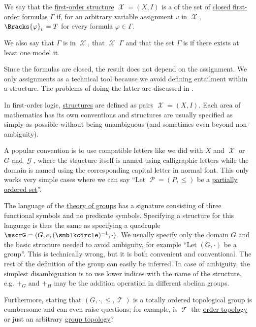\begin{definition}\label{def:first_order_model}
  We say that the \hyperref[def:first_order_structure]{first-order structure} \( \mscrX = (X, I) \) is a  of the set of \hyperref[def:first_order_syntax/closed_formula]{closed first-order formulas} \( \Gamma \) if, for an arbitrary variable assignment \( v \) in \( \mscrX \), \( \Bracks{\varphi}_v = T \) for every formula \( \varphi \in \Gamma \).

  We also say that \( \Gamma \) is  in \( \mscrX \), that \( \mscrX \)  \( \Gamma \) and that the set \( \Gamma \) is  if there exists at least one model it.
\end{definition}
\begin{comments}
  \item Since the formulas are closed, the result does not depend on the assignment. We only assignments as a technical tool because we avoid defining entailment within a structure. The problems of doing the latter are discussed in .
\end{comments}

\begin{remark}\label{rem:first_order_model_notation}
  In first-order logic, \hyperref[def:first_order_structure]{structures} are defined as pairs \( \mscrX = (X, I) \). Each area of mathematics has its own conventions and structures are usually specified as simply as possible without being unambiguous (and sometimes even beyond non-ambiguity).

  A popular convention is to use compatible letters like we did with \( X \) and \( \mscrX \) or \( G \) and \( \mscrG \), where the structure itself is named using calligraphic letters while the domain is named using the corresponding capital letter in normal font. This only works very simple cases where we can say \enquote{Let \( \mscrP = (P, \leq) \) be a \hyperref[def:partially_ordered_set]{partially ordered set}}.

  The language of the \hyperref[def:group/theory]{theory of groups} has a signature consisting of three functional symbols and no predicate symbols. Specifying a structure for this language is thus the same as specifying a quadruple \( \mscrG = (G, e, (\anon)^{-1}, \cdot) \). We usually specify only the domain \( G \) and the basic structure needed to avoid ambiguity, for example \enquote{Let \( (G, \cdot) \) be a group}. This is technically wrong, but it is both convenient and conventional. The rest of the definition of the group can easily be inferred. In case of ambiguity, the simplest disambiguation is to use lower indices with the name of the structure, e.g. \( +_G \) and \( +_H \) may be the addition operation in different abelian groups.

  Furthermore, stating that \( (G, \cdot, \leq, \mscrT) \) is a totally ordered topological group is cumbersome and can even raise questions; for example, is \( \mscrT \) the \hyperref[def:order_topology]{order topology} or just an arbitrary \hyperref[rem:topological_first_order_structures]{group topology}?
\end{remark}

